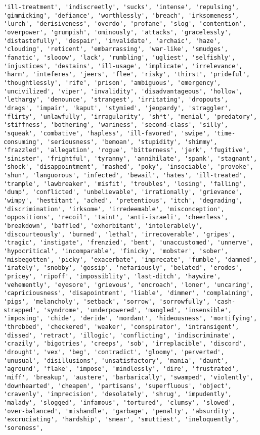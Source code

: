 \documentclass[11pt]{article}
\begin{document}
\begin{Verbatim}[commandchars=\\\{\}]
'ill-treatment', 'indiscreetly', 'sucks', 'intense', 'repulsing', 'gimmicking', 'defiance', 'worthlessly', 'breach', 'irksomeness', 'lurch', 'derisiveness', 'overdo', 'profane', 'slog', 'contention', 'overpower', 'grumpish', 'ominously', 'attacks', 'gracelessly', 'distastefully', 'despair', 'invalidate', 'archaic', 'haze', 'clouding', 'reticent', 'embarrassing', 'war-like', 'smudges', 'fanatic', 'slooow', 'lack', 'rumbling', 'ugliest', 'selfishly', 'injustices', 'destains', 'ill-usage', 'implicate', 'irrelevance', 'harm', 'inteferes', 'jeers', 'flee', 'risky', 'thirst', 'prideful', 'thoughtlessly', 'rife', 'prison', 'ambiguous', 'emergency', 'uncivilized', 'viper', 'invalidity', 'disadvantageous', 'hollow', 'lethargy', 'denounce', 'strangest', 'irritating', 'dropouts', 'drags', 'impair', 'kaput', 'stymied', 'jeopardy', 'straggler', 'flirty', 'unlawfully', 'irragularity', 'sh*t', 'menial', 'predatory', 'stiffness', 'bothering', 'wariness', 'second-class', 'silly', 'squeak', 'combative', 'hapless', 'ill-favored', 'swipe', 'time-consuming', 'seriousness', 'bemoan', 'stupidity', 'shimmy', 'frazzled', 'allegation', 'rogue', 'bitterness', 'jerk', 'fugitive', 'sinister', 'frightful', 'tyranny', 'annihilate', 'spank', 'stagnant', 'shock', 'disappointment', 'mashed', 'poky', 'insociable', 'provoke', 'shun', 'languorous', 'infected', 'bewail', 'hates', 'ill-treated', 'trample', 'lawbreaker', 'misfit', 'troubles', 'losing', 'falling', 'dump', 'conflicted', 'unbelievable', 'irrationally', 'grievance', 'wimpy', 'hestitant', 'ached', 'pretentious', 'itch', 'degrading', 'discrimination', 'irksome', 'irredeemable', 'misconception', 'oppositions', 'recoil', 'taint', 'anti-israeli', 'cheerless', 'breakdown', 'baffled', 'exhorbitant', 'intolerablely', 'discourteously', 'burned', 'lethal', 'irrecoverable', 'gripes', 'tragic', 'instigate', 'frenzied', 'bent', 'unaccustomed', 'unnerve', 'hypocritical', 'incomparable', 'finicky', 'mobster', 'sober', 'misbegotten', 'picky', 'exacerbate', 'imprecate', 'fumble', 'damned', 'irately', 'snobby', 'gossip', 'nefariously', 'belated', 'erodes', 'pricey', 'ripoff', 'impossiblity', 'last-ditch', 'haywire', 'vehemently', 'eyesore', 'grievous', 'encroach', 'loner', 'uncaring', 'capriciousness', 'disapointment', 'liable', 'dimmer', 'complaining', 'pigs', 'melancholy', 'setback', 'sorrow', 'sorrowfully', 'cash-strapped', 'syndrome', 'underpowered', 'mangled', 'insensible', 'imposing', 'chide', 'deride', 'mordant', 'hideousness', 'mortifying', 'throbbed', 'checkered', 'weaker', 'conspirator', 'intransigent', 'dissed', 'retract', 'illogic', 'conflicting', 'indiscriminate', 'crazily', 'bigotries', 'creeps', 'sob', 'irreplacible', 'discord', 'drought', 'vex', 'beg', 'contradict', 'gloomy', 'perverted', 'unusual', 'disillusions', 'unsatisfactory', 'mania', 'daunt', 'aground', 'flake', 'impose', 'mindlessly', 'dire', 'frustrated', 'miff', 'breakup', 'austere', 'barbarically', 'swamped', 'violently', 'downhearted', 'cheapen', 'partisans', 'superfluous', 'object', 'cravenly', 'imprecision', 'desolately', 'shrug', 'impudently', 'malady', 'slogged', 'infamous', 'tortured', 'clumsy', 'slowed', 'over-balanced', 'mishandle', 'garbage', 'penalty', 'absurdity', 'excruciating', 'hardship', 'smear', 'smuttiest', 'ineloquently', 'soreness', 
\end{Verbatim}
\end{document}
